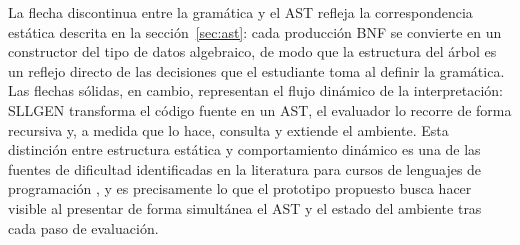 La flecha discontinua entre la gramática y el AST refleja la correspondencia estática descrita en la sección~\ref{sec:ast}: cada producción BNF se convierte en un constructor del tipo de datos algebraico, de modo que la estructura del árbol es un reflejo directo de las decisiones que el estudiante toma al definir la gramática. Las flechas sólidas, en cambio, representan el flujo dinámico de la interpretación: SLLGEN transforma el código fuente en un AST, el evaluador lo recorre de forma recursiva y, a medida que lo hace, consulta y extiende el ambiente. Esta distinción entre estructura estática y comportamiento dinámico es una de las fuentes de dificultad identificadas en la literatura para cursos de lenguajes de programación \cite{zagami2023}, y es precisamente lo que el prototipo propuesto busca hacer visible al presentar de forma simultánea el AST y el estado del ambiente tras cada paso de evaluación.
